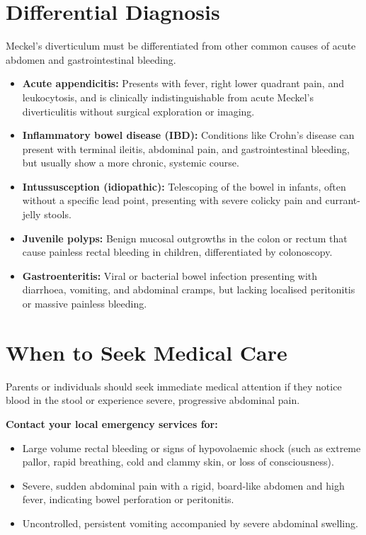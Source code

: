 \section*{Differential Diagnosis}
Meckel's diverticulum must be differentiated from other common causes of acute abdomen and gastrointestinal bleeding.
\begin{itemize}
    \item \textbf{Acute appendicitis:} Presents with fever, right lower quadrant pain, and leukocytosis, and is clinically indistinguishable from acute Meckel's diverticulitis without surgical exploration or imaging.
    \item \textbf{Inflammatory bowel disease (IBD):} Conditions like Crohn's disease can present with terminal ileitis, abdominal pain, and gastrointestinal bleeding, but usually show a more chronic, systemic course.
    \item \textbf{Intussusception (idiopathic):} Telescoping of the bowel in infants, often without a specific lead point, presenting with severe colicky pain and currant-jelly stools.
    \item \textbf{Juvenile polyps:} Benign mucosal outgrowths in the colon or rectum that cause painless rectal bleeding in children, differentiated by colonoscopy.
    \item \textbf{Gastroenteritis:} Viral or bacterial bowel infection presenting with diarrhoea, vomiting, and abdominal cramps, but lacking localised peritonitis or massive painless bleeding.
\end{itemize}

\section*{When to Seek Medical Care}
Parents or individuals should seek immediate medical attention if they notice blood in the stool or experience severe, progressive abdominal pain.

\textbf{Contact your local emergency services for:}
\begin{itemize}
    \item Large volume rectal bleeding or signs of hypovolaemic shock (such as extreme pallor, rapid breathing, cold and clammy skin, or loss of consciousness).
    \item Severe, sudden abdominal pain with a rigid, board-like abdomen and high fever, indicating bowel perforation or peritonitis.
    \item Uncontrolled, persistent vomiting accompanied by severe abdominal swelling.
\end{itemize}

